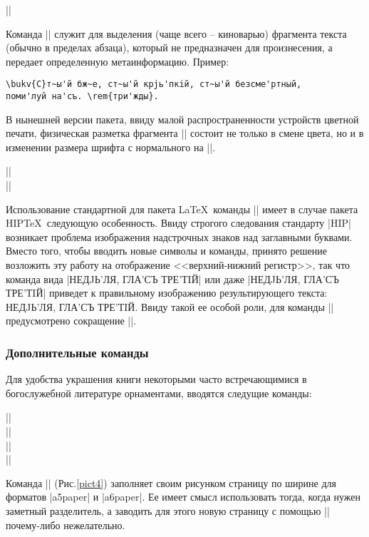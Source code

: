 \documentclass{ltxguide}
\begin{document}
\begin{decl}
  ||
\end{decl}

Команда |\rem| служит для выделения (чаще всего -- киноварью)
фрагмента текста (обычно в пределах абзаца), который не предназначен
для произнесения, а передает определенную метаинформацию. Пример:

\begin{verbatim}
\bukv{С}т~ы'й бж~е, ст~ы'й крjь'пкiй, ст~ы'й безсме'ртный, 
поми'луй на'съ. \rem{три'жды}.
\end{verbatim}

В нынешней версии пакета, ввиду малой распространенности устройств
цветной печати, физическая разметка фрагмента |\rem| состоит не только
в смене цвета, но и в изменении размера шрифта с нормального на |\small|.

\begin{decl}
  |\MakeUppercase|\\
  |\MUC|
\end{decl}

Использование стандартной для пакета \LaTeX\ команды |\MakeUppercase|
имеет в случае пакета HIP\TeX\ следующую особенность. Ввиду строгого
следования стандарту |HIP| возникает проблема изображения надстрочных
знаков над заглавными буквами. Вместо того, чтобы вводить новые
символы и команды, принято решение возложить эту работу на отображение
<<верхний-нижний регистр>>, так что команда вида
|\MakeUppercase{НЕДJЬ'ЛЯ, ГЛА'СЪ ТРЕ'ТIЙ}| или даже
|\MakeUppercase{недjь'ля, гла'съ тре'тiй}| приведет к правильному
изображению результирующего текста: {\cs \MakeUppercase{недjь'ля,
гла'съ тре'тiй}}. Ввиду такой ее особой роли, для команды
|\MakeUppercase| предусмотрено сокращение |\MUC|.

\subsubsection{Дополнительные команды}

Для удобства украшения книги некоторыми часто встречающимися в
богослужебной литературе орнаментами, вводятся следущие команды:

\begin{decl}
  |\delimpict|\\
  |\csendpict|\\
  |\csendpictsmall|\\
  |\hdrcross|
\end{decl}

Команда |\hdrcross| (Рис.\ref{pict4}) заполняет своим рисунком страницу по ширине для
форматов |a5paper| и |a6paper|. Ее имеет смысл использовать тогда,
когда нужен заметный разделитель, а заводить для этого новую страницу
с помощью |\hdrcrosspage| почему-либо нежелательно.
\end{document}

